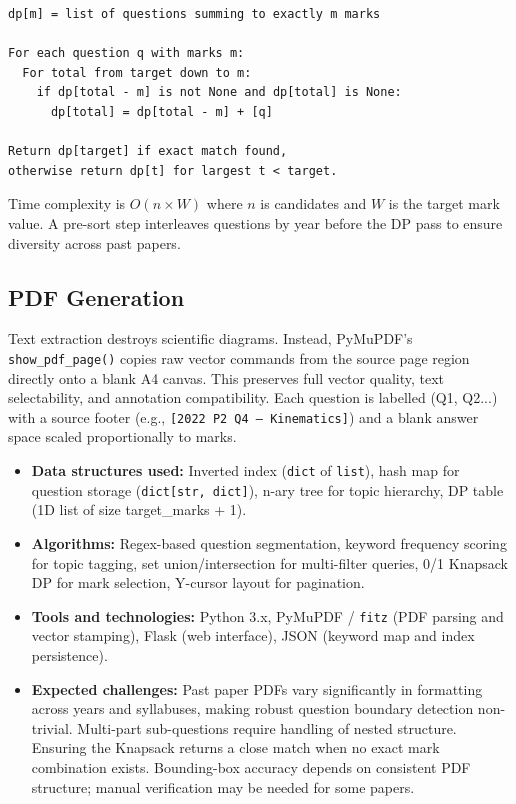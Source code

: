 \documentclass[10pt]{article}
\begin{document}
\begin{lstlisting}
dp[m] = list of questions summing to exactly m marks

For each question q with marks m:
  For total from target down to m:
    if dp[total - m] is not None and dp[total] is None:
      dp[total] = dp[total - m] + [q]

Return dp[target] if exact match found,
otherwise return dp[t] for largest t < target.
\end{lstlisting}

Time complexity is $O(n \times W)$ where $n$ is candidates and $W$ is the target mark value. A pre-sort step interleaves questions by year before the DP pass to ensure diversity across past papers.

\subsection*{PDF Generation}
Text extraction destroys scientific diagrams. Instead, PyMuPDF's \texttt{show\_pdf\_page()} copies raw vector commands from the source page region directly onto a blank A4 canvas. This preserves full vector quality, text selectability, and annotation compatibility. Each question is labelled (Q1, Q2...) with a source footer (e.g., \texttt{[2022 P2 Q4 --- Kinematics]}) and a blank answer space scaled proportionally to marks.

\begin{itemize}
    \item \textbf{Data structures used:} Inverted index (\texttt{dict} of \texttt{list}), hash map for question storage (\texttt{dict[str, dict]}), n-ary tree for topic hierarchy, DP table (1D list of size target\_marks + 1).
    \item \textbf{Algorithms:} Regex-based question segmentation, keyword frequency scoring for topic tagging, set union/intersection for multi-filter queries, 0/1 Knapsack DP for mark selection, Y-cursor layout for pagination.
    \item \textbf{Tools and technologies:} Python 3.x, PyMuPDF / \texttt{fitz} (PDF parsing and vector stamping), Flask (web interface), JSON (keyword map and index persistence).
    \item \textbf{Expected challenges:} Past paper PDFs vary significantly in formatting across years and syllabuses, making robust question boundary detection non-trivial. Multi-part sub-questions require handling of nested structure. Ensuring the Knapsack returns a close match when no exact mark combination exists. Bounding-box accuracy depends on consistent PDF structure; manual verification may be needed for some papers.
\end{itemize}
\end{document}
